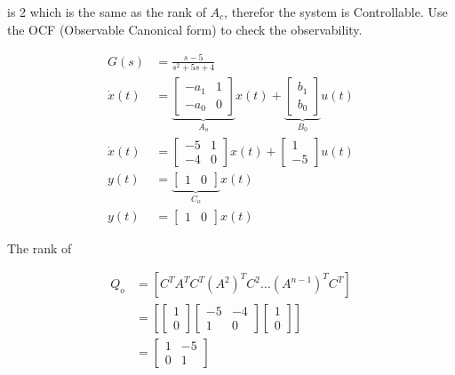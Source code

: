 \documentclass[main.tex]{subfiles}
\begin{document}
\begin{enumerate}
\begin{enumerate}
        is 2 which is the same as the rank of $A_c$, therefor the system is Controllable. Use the OCF (Observable Canonical form) to check the observability.

        $$
        \begin{aligned}
        G(s) &= \frac{s-5}{s^2+5s+4}\\
        \dot{x}(t) &= \underbrace{\left[\begin{array}{ll}
        -a_1 & 1 \\
        -a_0 & 0
        \end{array}\right]}_{A_o} x(t)+\underbrace{\left[\begin{array}{l}
        b_1 \\
        b_0
        \end{array}\right]}_{B_0} u(t) \\
        \dot{x}(t) &= \left[\begin{array}{lll}
        -5 & 1 \\
        -4 & 0
        \end{array}\right] x(t) + \left[\begin{array}{l}
        1 \\
        -5
        \end{array}\right] u(t) \\
        y(t) &= \underbrace{\left[\begin{array}{lll}
        1 & 0
        \end{array}\right]}_{C_o} x(t) \\
        y(t) &= \left[\begin{array}{ll}
        1 & 0
        \end{array}\right] x(t)
        \end{aligned}
        $$
        
        The rank of
        
        $$
        \begin{aligned}
        Q_o &= \left[C^T A^T C^T\left(A^2\right)^T C^2 \ldots\left(A^{n-1}\right)^T C^T\right]\\
        &= \left[ \left[\begin{array}{l}
        1 \\
        0
        \end{array}\right] \left[\begin{array}{ll}
        -5 & -4 \\
        1 & 0
        \end{array}\right] \left[\begin{array}{l}
        1 \\ 0
        \end{array}\right] \right] \\
        & = \left[\begin{array}{ll}
        1 & -5 \\
        0 & 1
        \end{array}\right]
        \end{aligned}
        $$
        

\end{enumerate}
\end{enumerate}
\end{document}

